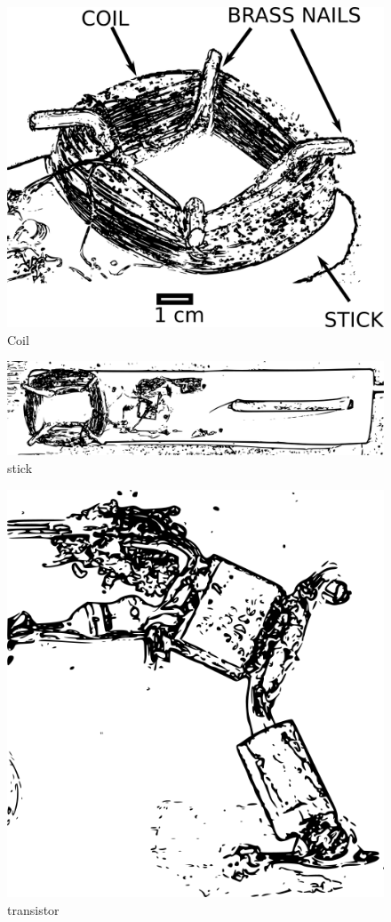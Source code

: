 \begin{figure}[htbp]
\centering
\includegraphics{images/coilzoom.png}
\caption{Coil}
\end{figure}

\begin{figure}[htbp]
\centering
\includegraphics{images/bigoscillator.png}
\caption{stick}
\end{figure}

\begin{figure}[htbp]
\centering
\includegraphics{images/transistorimage.png}
\caption{transistor}
\end{figure}

